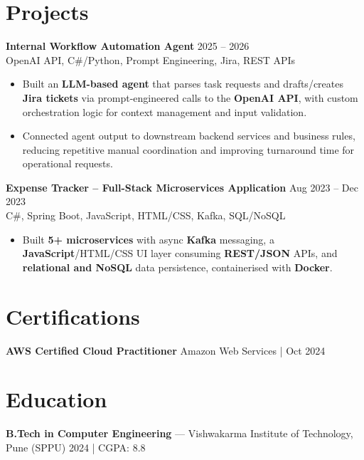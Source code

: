 \documentclass[10pt,letterpaper]{article}
\newcommand{\resumeSubheading}[4]{%
  \textbf{#1} \hfill #2 \\
  #3 \hfill #4 \\
}
\begin{document}
\section*{Projects}

\resumeSubheading{Internal Workflow Automation Agent}{2025 -- 2026}{}{OpenAI API, C\#/Python, Prompt Engineering, Jira, REST APIs}
\begin{itemize}
    \item Built an \textbf{LLM-based agent} that parses task requests and drafts/creates \textbf{Jira tickets} via prompt-engineered calls to the \textbf{OpenAI API}, with custom orchestration logic for context management and input validation.
    \item Connected agent output to downstream backend services and business rules, reducing repetitive manual coordination and improving turnaround time for operational requests.
\end{itemize}

\resumeSubheading{Expense Tracker -- Full-Stack Microservices Application}{Aug 2023 -- Dec 2023}{}{C\#, Spring Boot, JavaScript, HTML/CSS, Kafka, SQL/NoSQL}
\begin{itemize}
    \item Built \textbf{5+ microservices} with async \textbf{Kafka} messaging, a \textbf{JavaScript}/HTML/CSS UI layer consuming \textbf{REST/JSON} APIs, and \textbf{relational and NoSQL} data persistence, containerised with \textbf{Docker}.
\end{itemize}

\section*{Certifications}
\textbf{AWS Certified Cloud Practitioner} \hfill Amazon Web Services \;|\; Oct 2024

\section*{Education}
\textbf{B.Tech in Computer Engineering} --- Vishwakarma Institute of Technology, Pune (SPPU) \hfill 2024 \;|\; CGPA: 8.8
\end{document}
